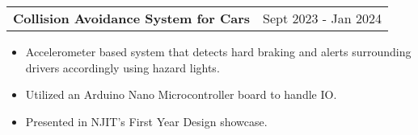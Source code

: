 \documentclass{article}
\begin{document}
    \raggedright\begin{tabular}{lr}
        \parbox[l]{3.65in}{\bf{\large{Collision Avoidance System for Cars}}} &
        \parbox[r]{3.65in}{\raggedleft Sept 2023 - Jan 2024} \\
    \end{tabular}
    \begin{itemize} \vspace{-5pt}
        \setlength{\itemsep}{-2pt}
        \item Accelerometer based system that detects hard braking and alerts surrounding drivers accordingly using hazard lights.
        \item Utilized an Arduino Nano Microcontroller board to handle IO.
        \item Presented in NJIT's First Year Design showcase.
    \end{itemize}
\end{document}
